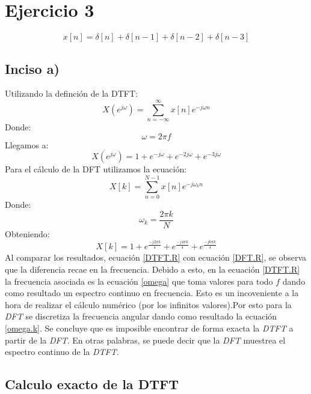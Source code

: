 \documentclass[letterpaper]{article}
\begin{document}
\section{Ejercicio 3}
\begin{equation}
    x[n]=\delta[n]+\delta[n-1]+\delta[n-2]+\delta[n-3]
\end{equation}
\subsection*{Inciso a)}
Utilizando la definción de la DTFT:
\begin{equation}
    X(e^{j\omega})=\sum_{n=-\infty}^{\infty}x[n]e^{-j\omega n}
\end{equation}
Donde:
\begin{equation}
    \label{omega}
    \omega=2\pi f
\end{equation}
Llegamos a:
\begin{equation}
    \label{DTFT.R}
    X(e^{j\omega})=1+e^{-j\omega}+e^{-2j\omega}+e^{-3j\omega}
\end{equation}
Para el cálculo de la DFT utilizamos la ecuación:
\begin{equation}
    X[k]=\sum_{n=0}^{N-1}x[n]e^{-j\omega_k n}
\end{equation}
Donde:
\begin{equation}
    \label{omega.k}
    \omega_k=\frac{2\pi k}{N}
\end{equation}
Obteniendo:
\begin{equation}
    \label{DFT.R}
    X[k]=1+e^{\frac{-j2\pi k }{4}}+e^{\frac{-j4\pi k}{4}}+e^{\frac{-j6\pi k}{4}}
\end{equation}
Al comparar los resultados, ecuación \ref{DTFT.R} con ecuación \ref{DFT.R}, se observa que la diferencia recae en la frecuencia. Debido a esto, en la ecuación 
\ref{DTFT.R} la frecuencia asociada es la ecuación \ref{omega} que toma valores para todo $f$ dando como resultado un espectro continuo en frecuencia. Esto es un incoveniente a la hora 
de realizar el cálculo numérico (por los infinitos valores).Por esto para la \textit{DFT} se discretiza la frecuencia angular dando como resultado la ecuación \ref{omega.k}. Se concluye que es imposible encontrar de forma exacta la \textit{DTFT} a partir de la \textit{DFT}. En otras palabras, se puede decir que 
la \textit{DFT} muestrea el espectro continuo de la \textit{DTFT}.

\subsection*{Calculo exacto de la DTFT}
\end{document}
